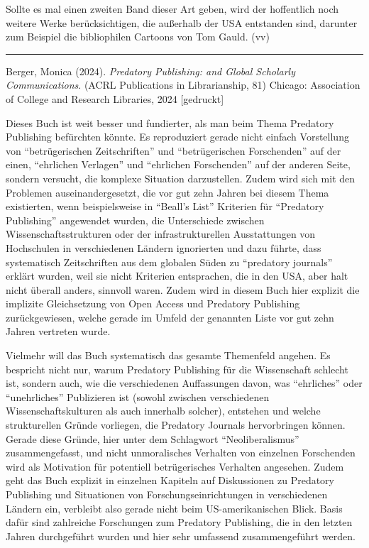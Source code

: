 \documentclass[a4paper,
fontsize=11pt,
oneside,
numbers=noperiodatend,
parskip=half-,
bibliography=totoc,
final
]{scrartcl}
\begin{document}
Sollte es mal einen zweiten Band dieser Art geben, wird der hoffentlich
noch weitere Werke berücksichtigen, die außerhalb der USA entstanden
sind, darunter zum Beispiel die bibliophilen Cartoons von Tom Gauld.
(vv)

\begin{center}\rule{0.5\linewidth}{0.5pt}\end{center}

Berger, Monica (2024). \emph{Predatory Publishing: and Global Scholarly
Communications}. (ACRL Publications in Librarianship, 81) Chicago:
Association of College and Research Libraries, 2024 {[}gedruckt{]}

Dieses Buch ist weit besser und fundierter, als man beim Thema Predatory
Publishing befürchten könnte. Es reproduziert gerade nicht einfach
Vorstellung von \enquote{betrügerischen Zeitschriften} und
\enquote{betrügerischen Forschenden} auf der einen, \enquote{ehrlichen
Verlagen} und \enquote{ehrlichen Forschenden} auf der anderen Seite,
sondern versucht, die komplexe Situation darzustellen. Zudem wird sich
mit den Problemen auseinandergesetzt, die vor gut zehn Jahren bei diesem
Thema existierten, wenn beispielsweise in \enquote{Beall's List}
Kriterien für \enquote{Predatory Publishing} angewendet wurden, die
Unterschiede zwischen Wissenschaftsstrukturen oder der
infrastrukturellen Ausstattungen von Hochschulen in verschiedenen
Ländern ignorierten und dazu führte, dass systematisch Zeitschriften aus
dem globalen Süden zu \enquote{predatory journals} erklärt wurden, weil
sie nicht Kriterien entsprachen, die in den USA, aber halt nicht überall
anders, sinnvoll waren. Zudem wird in diesem Buch hier explizit die
implizite Gleichsetzung von Open Access und Predatory Publishing
zurückgewiesen, welche gerade im Umfeld der genannten Liste vor gut zehn
Jahren vertreten wurde.

Vielmehr will das Buch systematisch das gesamte Themenfeld angehen. Es
bespricht nicht nur, warum Predatory Publishing für die Wissenschaft
schlecht ist, sondern auch, wie die verschiedenen Auffassungen davon,
was \enquote{ehrliches} oder \enquote{unehrliches} Publizieren ist
(sowohl zwischen verschiedenen Wissenschaftskulturen als auch innerhalb
solcher), entstehen und welche strukturellen Gründe vorliegen, die
Predatory Journals hervorbringen können. Gerade diese Gründe, hier unter
dem Schlagwort \enquote{Neoliberalismus} zusammengefasst, und nicht
unmoralisches Verhalten von einzelnen Forschenden wird als Motivation
für potentiell betrügerisches Verhalten angesehen. Zudem geht das Buch
explizit in einzelnen Kapiteln auf Diskussionen zu Predatory Publishing
und Situationen von Forschungseinrichtungen in verschiedenen Ländern
ein, verbleibt also gerade nicht beim US-amerikanischen Blick. Basis
dafür sind zahlreiche Forschungen zum Predatory Publishing, die in den
letzten Jahren durchgeführt wurden und hier sehr umfassend
zusammengeführt werden.
\end{document}
